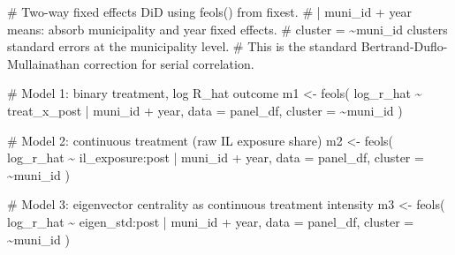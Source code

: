 \documentclass[
  11pt,
  letterpaper,
  DIV=11,
  numbers=noendperiod]{scrartcl}
\newenvironment{Shaded}{}{}
\newcommand{\AttributeTok}[1]{\textcolor[rgb]{0.84,0.23,0.29}{#1}}
\newcommand{\CommentTok}[1]{\textcolor[rgb]{0.42,0.45,0.49}{#1}}
\newcommand{\FunctionTok}[1]{\textcolor[rgb]{0.44,0.26,0.76}{#1}}
\newcommand{\NormalTok}[1]{\textcolor[rgb]{0.14,0.16,0.18}{#1}}
\newcommand{\OtherTok}[1]{\textcolor[rgb]{0.44,0.26,0.76}{#1}}
\newcommand{\SpecialCharTok}[1]{\textcolor[rgb]{0.00,0.36,0.77}{#1}}
\begin{document}
\begin{Shaded}
\begin{Highlighting}[]
\CommentTok{\# Two{-}way fixed effects DiD using feols() from fixest.}
\CommentTok{\# | muni\_id + year means: absorb municipality and year fixed effects.}
\CommentTok{\# cluster = \textasciitilde{}muni\_id clusters standard errors at the municipality level.}
\CommentTok{\# This is the standard Bertrand{-}Duflo{-}Mullainathan correction for serial correlation.}

\CommentTok{\# Model 1: binary treatment, log R\_hat outcome}
\NormalTok{m1 }\OtherTok{\textless{}{-}} \FunctionTok{feols}\NormalTok{(}
\NormalTok{  log\_r\_hat }\SpecialCharTok{\textasciitilde{}}\NormalTok{ treat\_x\_post }\SpecialCharTok{|}\NormalTok{ muni\_id }\SpecialCharTok{+}\NormalTok{ year,}
  \AttributeTok{data    =}\NormalTok{ panel\_df,}
  \AttributeTok{cluster =} \SpecialCharTok{\textasciitilde{}}\NormalTok{muni\_id}
\NormalTok{)}

\CommentTok{\# Model 2: continuous treatment (raw IL exposure share)}
\NormalTok{m2 }\OtherTok{\textless{}{-}} \FunctionTok{feols}\NormalTok{(}
\NormalTok{  log\_r\_hat }\SpecialCharTok{\textasciitilde{}}\NormalTok{ il\_exposure}\SpecialCharTok{:}\NormalTok{post }\SpecialCharTok{|}\NormalTok{ muni\_id }\SpecialCharTok{+}\NormalTok{ year,}
  \AttributeTok{data    =}\NormalTok{ panel\_df,}
  \AttributeTok{cluster =} \SpecialCharTok{\textasciitilde{}}\NormalTok{muni\_id}
\NormalTok{)}

\CommentTok{\# Model 3: eigenvector centrality as continuous treatment intensity}
\NormalTok{m3 }\OtherTok{\textless{}{-}} \FunctionTok{feols}\NormalTok{(}
\NormalTok{  log\_r\_hat }\SpecialCharTok{\textasciitilde{}}\NormalTok{ eigen\_std}\SpecialCharTok{:}\NormalTok{post }\SpecialCharTok{|}\NormalTok{ muni\_id }\SpecialCharTok{+}\NormalTok{ year,}
  \AttributeTok{data    =}\NormalTok{ panel\_df,}
  \AttributeTok{cluster =} \SpecialCharTok{\textasciitilde{}}\NormalTok{muni\_id}
\NormalTok{)}


\end{Highlighting}
\end{Shaded}
\end{document}
